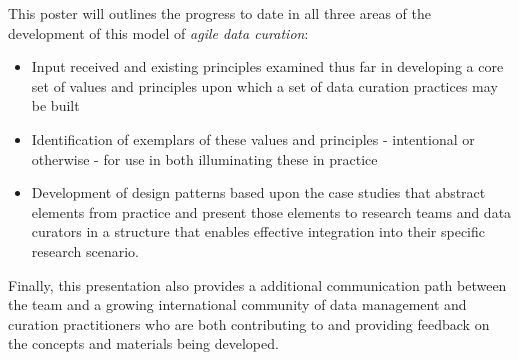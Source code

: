 \documentclass[poster,17]{idcc}
\begin{document}
This poster will outlines the progress to date in all three areas of the
development of this model of \emph{agile data curation}:

\begin{itemize}
\itemsep1pt\parskip0pt
\item
  Input received and existing principles examined thus far in developing
  a core set of values and principles upon which a set of data curation
  practices may be built
\item
  Identification of exemplars of these values and principles -
  intentional or otherwise - for use in both illuminating these in
  practice
\item
  Development of design patterns based upon the case studies that
  abstract elements from practice and present those elements to research
  teams and data curators in a structure that enables effective
  integration into their specific research scenario.
\end{itemize}

Finally, this presentation also provides a additional communication path
between the team and a growing international community of data
management and curation practitioners who are both contributing to and
providing feedback on the concepts and materials being developed.
\end{document}
